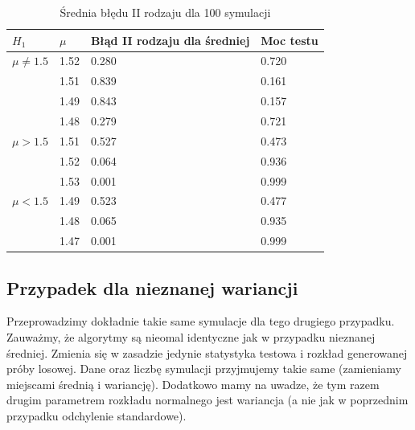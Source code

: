 \documentclass{article}
\theoremstyle{break}
\begin{document}
\begin{table}[H]
\begin{center}
	\begin{tabular}{|l|l|l|l|}
		\hline
		\rowcolor[HTML]{EFEFEF}
		$H_1$                     & $\mu$   & Błąd II rodzaju dla średniej & Moc testu   \\ \hline
		{$\mu\ne1.5$}            			& 1.52 & 0.280                    & 0.720 \\ \cline{2-4} 
		& 1.51 & 0.839                        & 0.161 \\ \cline{2-4} 
		& 1.49 & 0.843                        & 0.157 \\ \cline{2-4} 
		& 1.48 & 0.279                        & 0.721 \\ \hline
		{$\mu>1.5$} 			& 1.51 & 0.527                        & 0.473 \\ \cline{2-4} 
		& 1.52 & 0.064                        & 0.936 \\ \cline{2-4} 
		& 1.53 & 0.001                        & 0.999 \\ \hline
		{$\mu<1.5$}   			 & 1.49 & 0.523                        & 0.477 \\ \cline{2-4} 
		& 1.48 & 0.065                        & 0.935 \\ \cline{2-4} 
		& 1.47 & 0.001                        & 0.999 \\ \hline
	\end{tabular}
\caption{Średnia błędu II rodzaju dla 100 symulacji}
\label{table:2}
\end{center}
\end{table}

\subsection*{Przypadek dla nieznanej wariancji}

Przeprowadzimy dokładnie takie same symulacje dla tego drugiego przypadku. Zauważmy, że algorytmy są nieomal identyczne jak w przypadku nieznanej średniej. Zmienia się w zasadzie jedynie statystyka testowa i rozkład generowanej próby losowej.
Dane oraz liczbę symulacji przyjmujemy takie same (zamieniamy miejscami średnią i wariancję). Dodatkowo mamy na uwadze, że tym razem drugim parametrem rozkładu normalnego jest wariancja (a nie jak w poprzednim przypadku odchylenie standardowe).
\end{document}
